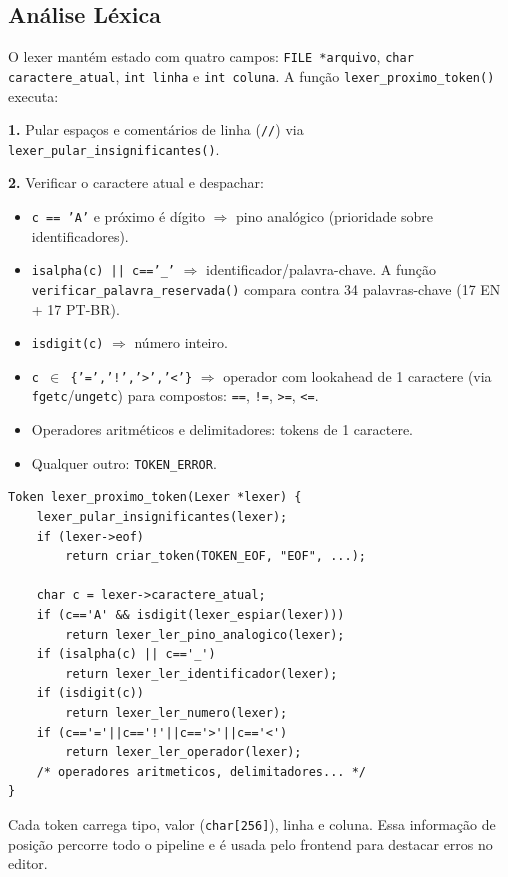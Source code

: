 \documentclass[conference]{IEEEtran}
\begin{document}
\subsection{Análise Léxica}

O lexer mantém estado com quatro campos: \texttt{FILE *arquivo},
\texttt{char caractere\_atual}, \texttt{int linha} e \texttt{int coluna}.
A função \texttt{lexer\_proximo\_token()} executa:

\textbf{1.} Pular espaços e comentários de linha (\texttt{//}) via
\texttt{lexer\_pular\_insignificantes()}.

\textbf{2.} Verificar o caractere atual e despachar:
\begin{itemize}
\item \texttt{c == 'A'} e próximo é dígito $\Rightarrow$ pino analógico
(prioridade sobre identificadores).
\item \texttt{isalpha(c) || c=='\_'} $\Rightarrow$ identificador/palavra-chave.
A função \texttt{verificar\_palavra\_reservada()} compara contra 34
palavras-chave (17 EN + 17 PT-BR).
\item \texttt{isdigit(c)} $\Rightarrow$ número inteiro.
\item \texttt{c $\in$ \{'=','!','>','<'\}} $\Rightarrow$ operador com
lookahead de 1 caractere (via \texttt{fgetc}/\texttt{ungetc}) para
compostos: \texttt{==}, \texttt{!=}, \texttt{>=}, \texttt{<=}.
\item Operadores aritméticos e delimitadores: tokens de 1 caractere.
\item Qualquer outro: \texttt{TOKEN\_ERROR}.
\end{itemize}

\begin{lstlisting}[style=csmall,caption={Função principal do lexer.},label={lst:lexer}]
Token lexer_proximo_token(Lexer *lexer) {
    lexer_pular_insignificantes(lexer);
    if (lexer->eof)
        return criar_token(TOKEN_EOF, "EOF", ...);

    char c = lexer->caractere_atual;
    if (c=='A' && isdigit(lexer_espiar(lexer)))
        return lexer_ler_pino_analogico(lexer);
    if (isalpha(c) || c=='_')
        return lexer_ler_identificador(lexer);
    if (isdigit(c))
        return lexer_ler_numero(lexer);
    if (c=='='||c=='!'||c=='>'||c=='<')
        return lexer_ler_operador(lexer);
    /* operadores aritmeticos, delimitadores... */
}
\end{lstlisting}

Cada token carrega tipo, valor (\texttt{char[256]}), linha e coluna.
Essa informação de posição percorre todo o pipeline e é usada pelo frontend
para destacar erros no editor.
\end{document}
